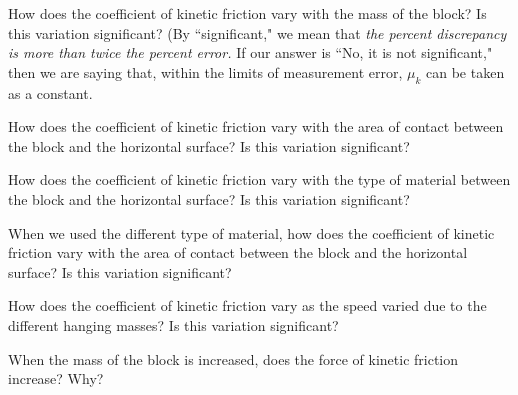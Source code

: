 \documentclass[main.tex]{subfiles}
\begin{document}
\begin{question}
How does the coefficient of kinetic friction vary with the mass of the block? Is this variation significant? (By ``significant," we mean that \emph{the percent discrepancy is more than twice the percent error.} If our answer is ``No, it is not significant," then we are saying that, within the limits of measurement error, $\mu_k$ can be taken as a constant.
\end{question}
\begin{question}
How does the coefficient of kinetic friction vary with the area of contact between the block and the horizontal surface? Is this variation significant?
\end{question}
\begin{question}
How does the coefficient of kinetic friction vary with the type of material between the block and the horizontal surface? Is this variation significant?
\end{question}
\begin{question}
When we used the different type of material, how does the coefficient of kinetic friction vary with the area of contact between the block and the horizontal surface? Is this variation significant?
\end{question}
\begin{question}
How does the coefficient of kinetic friction vary as the speed varied due to the different hanging masses? Is this variation significant?
\end{question}
\begin{question}
When the mass of the block is increased, does the force of kinetic friction increase? Why?
\end{question}
\end{document}
